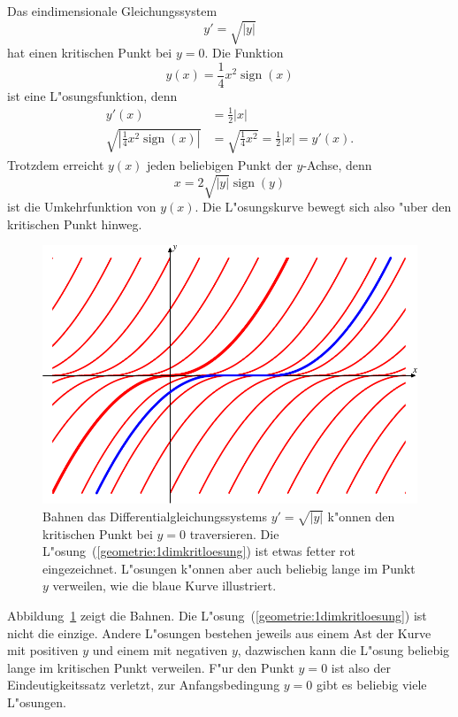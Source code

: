 \begin{beispiel}
Das eindimensionale Gleichungssystem
\[
y'=\sqrt{|y|}
\]
hat einen kritischen Punkt bei $y=0$.
Die Funktion
\begin{equation}
y(x)=\frac14x^2\operatorname{sign}(x)
\label{geometrie:1dimkritloesung}
\end{equation}
ist eine L"osungsfunktion, denn
\begin{align*}
y'(x)&=\frac12|x|\\
\sqrt{\left|\frac14x^2\operatorname{sign}(x)\right|}
&=
\sqrt{\frac14x^2}
=
\frac12|x|=y'(x).
\end{align*}
Trotzdem erreicht $y(x)$ jeden beliebigen Punkt der $y$-Achse, denn 
\[
x=2\sqrt{|y|}\operatorname{sign}(y)
\]
ist die Umkehrfunktion von $y(x)$. 
Die L"osungskurve bewegt sich also "uber den kritischen Punkt hinweg.
\begin{figure}
\centering
\includegraphics{chapters/images/geometrie-1.pdf}
\caption{Bahnen das Differentialgleichungssystems $y'=\sqrt{|y|}$
k"onnen den kritischen Punkt bei $y=0$ traversieren.
Die L"osung~(\ref{geometrie:1dimkritloesung}) ist etwas fetter rot
eingezeichnet.
L"osungen k"onnen aber auch beliebig lange im Punkt $y$ verweilen,
wie die blaue Kurve illustriert.
\label{geometrie:1dimkrit}}
\end{figure}
Abbildung~\ref{geometrie:1dimkrit} zeigt die Bahnen.
Die L"osung~(\ref{geometrie:1dimkritloesung}) ist nicht die einzige.
Andere L"osungen bestehen jeweils aus einem Ast der Kurve mit positiven
$y$ und einem mit negativen $y$, dazwischen kann die L"osung beliebig lange
im kritischen Punkt verweilen.
F"ur den Punkt $y=0$ ist also der Eindeutigkeitssatz verletzt, zur
Anfangsbedingung $y=0$ gibt es beliebig viele L"osungen.
\end{beispiel}

